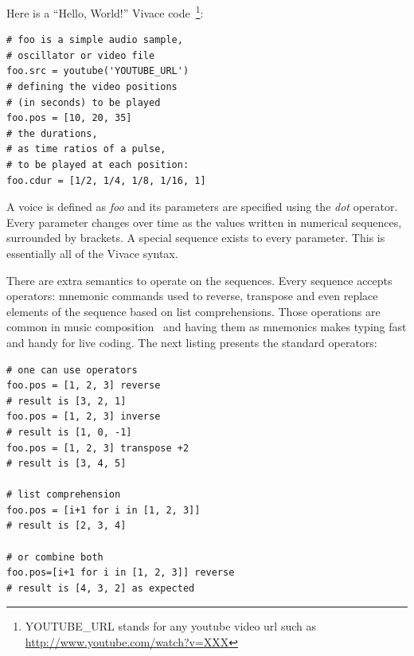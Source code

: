 \documentclass[12pt,times,twocolumn]{article}
\begin{document}
Here is a ``Hello, World!'' Vivace code~\footnote{YOUTUBE\_URL
stands for any youtube video url such as \url{http://www.youtube.com/watch?v=XXX}}:

\begin{Verbatim}[fontfamily=courier, xleftmargin=\parindent,fontsize=\footnotesize]
# foo is a simple audio sample,
# oscillator or video file
foo.src = youtube('YOUTUBE_URL')
# defining the video positions
# (in seconds) to be played
foo.pos = [10, 20, 35]
# the durations,
# as time ratios of a pulse,
# to be played at each position:
foo.cdur = [1/2, 1/4, 1/8, 1/16, 1]
\end{Verbatim}


A voice is defined as \textit{foo} and its parameters are specified
using the \textit{dot} operator. Every parameter changes over time as
the values written in numerical sequences, surrounded by brackets. A
special sequence exists to every parameter. This is essentially all of
the Vivace syntax.

There are extra semantics to operate on the sequences. Every sequence
accepts operators: mnemonic commands used to reverse, transpose and
even replace elements of the sequence based on list
comprehensions. Those operations are common in music composition~\cite{collins2011live} and
having them as mnemonics makes typing fast and handy for live
coding. The next listing presents the standard operators:

\begin{Verbatim}[fontfamily=courier, xleftmargin=\parindent,fontsize=\footnotesize]
# one can use operators
foo.pos = [1, 2, 3] reverse
# result is [3, 2, 1]
foo.pos = [1, 2, 3] inverse 
# result is [1, 0, -1]
foo.pos = [1, 2, 3] transpose +2   
# result is [3, 4, 5]

# list comprehension
foo.pos = [i+1 for i in [1, 2, 3]] 
# result is [2, 3, 4]

# or combine both
foo.pos=[i+1 for i in [1, 2, 3]] reverse 
# result is [4, 3, 2] as expected
\end{Verbatim}
\end{document}
